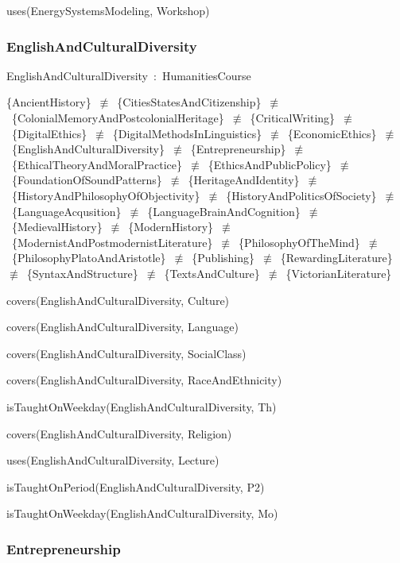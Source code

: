 \documentclass{article}
\begin{document}
uses(EnergySystemsModeling, Workshop)

\subsubsection*{EnglishAndCulturalDiversity}

EnglishAndCulturalDiversity~:~HumanitiesCourse

\{AncientHistory\}~\ensuremath{\not\equiv}~\{CitiesStatesAndCitizenship\}~\ensuremath{\not\equiv}~\{ColonialMemoryAndPostcolonialHeritage\}~\ensuremath{\not\equiv}~\{CriticalWriting\}~\ensuremath{\not\equiv}~\{DigitalEthics\}~\ensuremath{\not\equiv}~\{DigitalMethodsInLinguistics\}~\ensuremath{\not\equiv}~\{EconomicEthics\}~\ensuremath{\not\equiv}~\{EnglishAndCulturalDiversity\}~\ensuremath{\not\equiv}~\{Entrepreneurship\}~\ensuremath{\not\equiv}~\{EthicalTheoryAndMoralPractice\}~\ensuremath{\not\equiv}~\{EthicsAndPublicPolicy\}~\ensuremath{\not\equiv}~\{FoundationOfSoundPatterns\}~\ensuremath{\not\equiv}~\{HeritageAndIdentity\}~\ensuremath{\not\equiv}~\{HistoryAndPhilosophyOfObjectivity\}~\ensuremath{\not\equiv}~\{HistoryAndPoliticsOfSociety\}~\ensuremath{\not\equiv}~\{LanguageAcqusition\}~\ensuremath{\not\equiv}~\{LanguageBrainAndCognition\}~\ensuremath{\not\equiv}~\{MedievalHistory\}~\ensuremath{\not\equiv}~\{ModernHistory\}~\ensuremath{\not\equiv}~\{ModernistAndPostmodernistLiterature\}~\ensuremath{\not\equiv}~\{PhilosophyOfTheMind\}~\ensuremath{\not\equiv}~\{PhilosophyPlatoAndAristotle\}~\ensuremath{\not\equiv}~\{Publishing\}~\ensuremath{\not\equiv}~\{RewardingLiterature\}~\ensuremath{\not\equiv}~\{SyntaxAndStructure\}~\ensuremath{\not\equiv}~\{TextsAndCulture\}~\ensuremath{\not\equiv}~\{VictorianLiterature\}

covers(EnglishAndCulturalDiversity, Culture)

covers(EnglishAndCulturalDiversity, Language)

covers(EnglishAndCulturalDiversity, SocialClass)

covers(EnglishAndCulturalDiversity, RaceAndEthnicity)

isTaughtOnWeekday(EnglishAndCulturalDiversity, Th)

covers(EnglishAndCulturalDiversity, Religion)

uses(EnglishAndCulturalDiversity, Lecture)

isTaughtOnPeriod(EnglishAndCulturalDiversity, P2)

isTaughtOnWeekday(EnglishAndCulturalDiversity, Mo)

\subsubsection*{Entrepreneurship}
\end{document}
